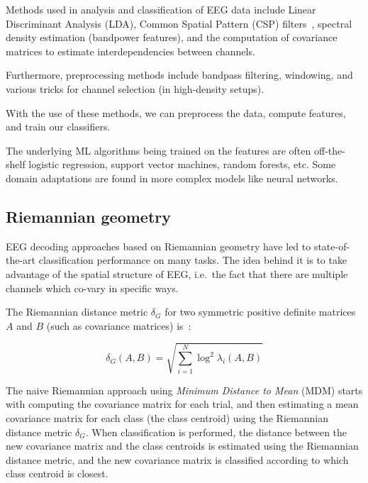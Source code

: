    Methods used in analysis and classification of EEG data include Linear Discriminant Analysis (LDA), Common Spatial Pattern (CSP) filters~\cite{barachant_common_2010}, spectral density estimation (bandpower features), and the computation of covariance matrices to estimate interdependencies between channels. 

    Furthermore, preprocessing methods include bandpass filtering, windowing, and various tricks for channel selection (in high-density setups). 

    With the use of these methods, we can preprocess the data, compute features, and train our classifiers.

    The underlying ML algorithms being trained on the features are often off-the-shelf logistic regression, support vector machines, random forests, etc. Some domain adaptations are found in more complex models like neural networks.



    \subsection{Riemannian geometry}\label{section:riemannian-theory}


        EEG decoding approaches based on Riemannian geometry have led to state-of-the-art classification performance on many tasks. The idea behind it is to take advantage of the spatial structure of EEG, i.e.\ the fact that there are multiple channels which co-vary in specific ways.

        The Riemannian distance metric $\delta_G$ for two symmetric positive definite matrices $A$ and $B$ (such as covariance matrices) is~\cite{grafarend_metric_2003}:

        \[ \delta_G(A, B) = \sqrt{\sum_{i=1}^N \log^2 \lambda_i (A, B) } \]

        The naive Riemannian approach using \emph{Minimum Distance to Mean} (MDM) starts with computing the covariance matrix for each trial, and then estimating a mean covariance matrix for each class (the class centroid) using the Riemannian distance metric $\delta_G$. When classification is performed, the distance between the new covariance matrix and the class centroids is estimated using the Riemannian distance metric, and the new covariance matrix is classified according to which class centroid is closest.

